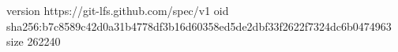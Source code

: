 version https://git-lfs.github.com/spec/v1
oid sha256:b7c8589c42d0a31b4778df3b16d60358ed5de2dbf33f2622f7324dc6b0474963
size 262240
